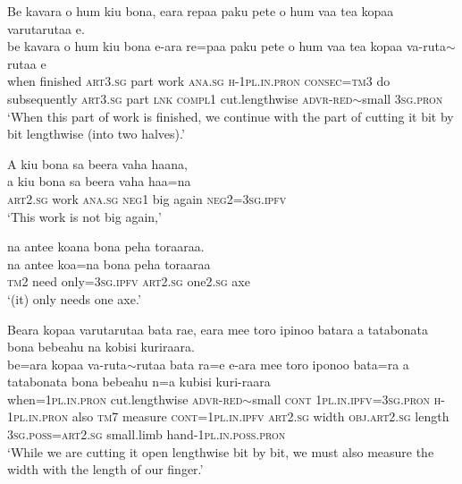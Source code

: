 \ea\label{ex:text15-22}
Be kavara o hum kiu bona, eara repaa paku pete o hum vaa tea kopaa varutarutaa e.\\
\gll be	kavara	o	hum	kiu	bona	e-ara	re=paa	paku	pete	o	hum	vaa	tea	kopaa	va-ruta{$\sim$}rutaa	e\\
     when	finished	\textsc{art}3.\textsc{sg}	part	work	\textsc{ana}.\textsc{sg}	\textsc{h}-1\textsc{pl}.\textsc{in}.\textsc{pron}	\textsc{consec}=\textsc{tm}3	do	subsequently	\textsc{art}3.\textsc{sg}	part	\textsc{lnk}	\textsc{compl}1	cut.lengthwise	\textsc{advr}-\textsc{red}{$\sim$}small	3\textsc{sg}.\textsc{pron}\\
\glt `When this part of work is finished, we continue with the part of cutting it bit by bit lengthwise (into two halves).'
\z

\ea\label{ex:text15-23}
A kiu bona sa beera vaha haana,\\
\gll a	kiu	bona	sa	beera	vaha	haa=na\\
     \textsc{art}2.\textsc{sg}	work	\textsc{ana}.\textsc{sg}	\textsc{neg}1	big	again	\textsc{neg}2=3\textsc{sg}.\textsc{ipfv}\\
\glt `This work is not big again,'
\z

\ea\label{ex:text15-24}
na antee koana bona peha toraaraa.\\
\gll na	antee	koa=na	bona	peha	toraaraa\\
     \textsc{tm}2	need	only=3\textsc{sg}.\textsc{ipfv}	\textsc{art}2.\textsc{sg}	one2.\textsc{sg}	axe\\
\glt `(it) only needs one axe.'
\z

\ea\label{ex:text15-25}
Beara kopaa varutarutaa bata rae, eara mee toro ipinoo batara a tatabonata bona bebeahu na kobisi kuriraara.\\
\gll be=ara	kopaa	va-ruta{$\sim$}rutaa	bata	ra=e	e-ara	mee	toro	iponoo	bata=ra	a	tatabonata	bona	bebeahu	n=a	kubisi kuri-raara\\
     when=1\textsc{pl}.\textsc{in}.\textsc{pron}	cut.lengthwise	\textsc{advr}-\textsc{red}{$\sim$}small	\textsc{cont}	1\textsc{pl}.\textsc{in}.\textsc{ipfv}=3\textsc{sg}.\textsc{pron}	\textsc{h}-1\textsc{pl}.\textsc{in}.\textsc{pron}	also	\textsc{tm}7	measure	\textsc{cont}=1\textsc{pl}.\textsc{in}.\textsc{ipfv}	\textsc{art}2.\textsc{sg}	width	\textsc{obj}.\textsc{art}2.\textsc{sg}	length	3\textsc{sg}.\textsc{poss}=\textsc{art}2.\textsc{sg}	small.limb  hand-1\textsc{pl}.\textsc{in}.\textsc{poss}.\textsc{pron}\\
\glt `While we are cutting it open lengthwise bit by bit, we must also measure the width with the length of our finger.'
\z


